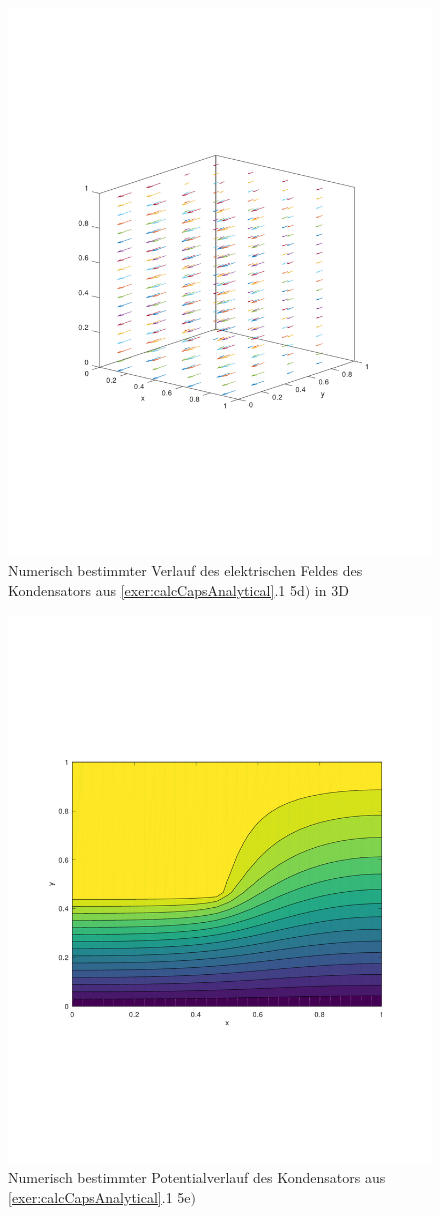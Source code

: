 \documentclass[Protokollheft.tex]{subfiles}
\begin{document}
\begin{figure}[h!]
	\centering
	\includegraphics[trim = 20mm 70mm 20mm 70mm, clip,width=0.7\linewidth]{E_3D_D.pdf}
	\caption{Numerisch bestimmter Verlauf des elektrischen Feldes des Kondensators aus \ref{exer:calcCapsAnalytical}.1 5d$)$ in 3D}
\end{figure}

\begin{figure}[h!]
	\centering
	\includegraphics[trim = 20mm 70mm 20mm 70mm, clip,width=0.7\linewidth]{potential_E.pdf}
	\caption{Numerisch bestimmter Potentialverlauf des Kondensators aus \ref{exer:calcCapsAnalytical}.1 5e$)$}
\end{figure}
\end{document}
